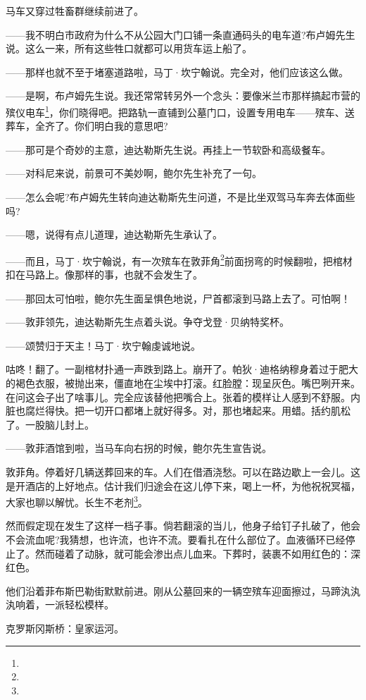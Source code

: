 \par 马车又穿过牲畜群继续前进了。
\par ——我不明白市政府为什么不从公园大门口铺一条直通码头的电车道?布卢姆先生说。这么一来，所有这些牲口就都可以用货车运上船了。
\par ——那样也就不至于堵塞道路啦，马丁·坎宁翰说。完全对，他们应该这么做。
\par ——是啊，布卢姆先生说。我还常常转另外一个念头：要像米兰市那样搞起市营的殡仪电车\footnote{}，你们晓得吧。把路轨一直铺到公墓门口，设置专用电车——殡车、送葬车，全齐了。你们明白我的意思吧?
\par ——那可是个奇妙的主意，迪达勒斯先生说。再挂上一节软卧和高级餐车。
\par ——对科尼来说，前景可不美妙啊，鲍尔先生补充了一句。
\par ——怎么会呢?布卢姆先生转向迪达勒斯先生问道，不是比坐双驾马车奔去体面些吗?
\par ——嗯，说得有点儿道理，迪达勒斯先生承认了。
\par ——而且，马丁·坎宁翰说，有一次殡车在敦菲角\footnote{}前面拐弯的时候翻啦，把棺材扣在马路上。像那样的事，也就不会发生了。
\par ——那回太可怕啦，鲍尔先生面呈惧色地说，尸首都滚到马路上去了。可怕啊！
\par ——敦菲领先，迪达勒斯先生点着头说。争夺戈登·贝纳特奖杯。
\par ——颂赞归于天主！马丁·坎宁翰虔诚地说。
\par 咕咚！翻了。一副棺材扑通一声跌到路上。崩开了。帕狄·迪格纳穆身着过于肥大的褐色衣服，被抛出来，僵直地在尘埃中打滚。红脸膛：现呈灰色。嘴巴咧开来。在问这会子出了啥事儿。完全应该替他把嘴合上。张着的模样让人感到不舒服。内脏也腐烂得快。把一切开口都堵上就好得多。对，那也堵起来。用蜡。括约肌松了。一股脑儿封上。
\par ——敦菲酒馆到啦，当马车向右拐的时候，鲍尔先生宣告说。
\par 敦菲角。停着好几辆送葬回来的车。人们在借酒浇愁。可以在路边歇上一会儿。这是开酒店的上好地点。估计我们归途会在这儿停下来，喝上一杯，为他祝祝冥福，大家也聊以解忧。长生不老剂\footnote{}。
\par 然而假定现在发生了这样一档子事。倘若翻滚的当儿，他身子给钉子扎破了，他会不会流血呢?我猜想，也许流，也许不流。要看扎在什么部位了。血液循环已经停止了。然而碰着了动脉，就可能会渗出点儿血来。下葬时，装裹不如用红色的：深红色。
\par 他们沿着菲布斯巴勒街默默前进。刚从公墓回来的一辆空殡车迎面擦过，马蹄汍汍汍响着，一派轻松模样。
\par 克罗斯冈斯桥：皇家运河。
